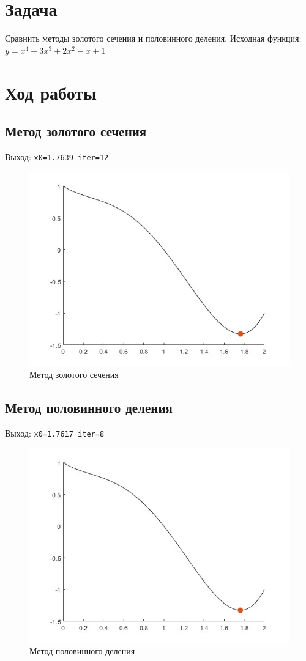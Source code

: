 \documentclass[a4paper,12pt]{article}
\begin{document}
	
	\section{Задача}
	Сравнить методы золотого сечения и половинного деления. Исходная функция: $\displaystyle y = x^4 - 3x^3 + 2x^2 -x + 1$
	\section{Ход работы}
	\subsection{Метод золотого сечения}
	Выход: \verb|x0=1.7639 iter=12|
	\begin{figure}[H]
		\centering
		\includegraphics[width=0.7\linewidth]{polytech/calc-math/report-lab4/subfiles/opt1}
		\caption{Метод золотого сечения}
		\label{fig:graph}
	\end{figure}
	
	\subsection{Метод половинного деления}
	Выход: \verb|x0=1.7617 iter=8|
	\begin{figure}[H]
		\centering
		\includegraphics[width=0.7\linewidth]{polytech/calc-math/report-lab4/subfiles/opt2}
		\caption{Метод половинного деления}
		\label{fig:graph}
	\end{figure}
	
\end{document}
